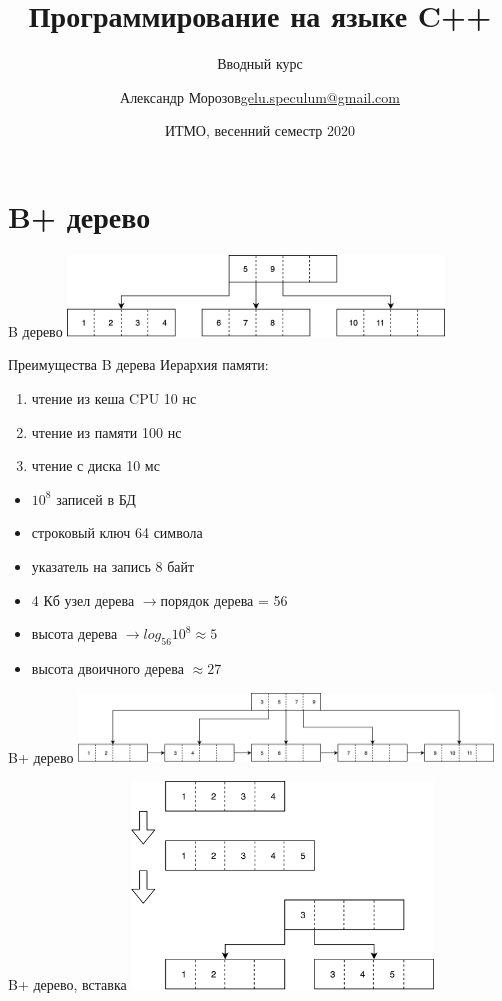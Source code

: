 \documentclass[unknownkeysallowed,xcolor=table]{beamer}
\title[C++]
{Программирование на языке C++}
\subtitle{Вводный курс}
\author[А.~Б.~Морозов]
{
  \texorpdfstring{Александр Морозов\newline\href{mailto:gelu.speculum@gmail.com}{gelu.speculum@gmail.com}}
  {Александр Морозов}
}
\date[ITMO 2020]
{ИТМО, весенний семестр 2020}
\newcommand{\textapprox}{\raisebox{0.5ex}{\texttildelow}}
\newcommand{\rarr}{$\rightarrow$}
\begin{document}
\frame{\titlepage}


\section{B+ дерево}

\begin{frame}{B дерево}
  \includegraphics[align=c,width=10cm,keepaspectratio]{images/btree.png}
\end{frame}

\begin{frame}{Преимущества B дерева}
  Иерархия памяти:
  \begin{enumerate}
    \item чтение из кеша CPU \textapprox 10 нс
    \item чтение из памяти \textapprox 100 нс
    \item чтение с диска \textapprox 10 мс
  \end{enumerate}
  \vspace{2em}
  \begin{itemize}
    \item $10^8$ записей в БД
    \item строковый ключ 64 символа
    \item указатель на запись 8 байт
    \item 4 Кб узел дерева \rarr порядок дерева = 56
    \item высота дерева \rarr $log_{56} 10^8 \approx 5$
    \item высота двоичного дерева $\approx 27$
  \end{itemize}
\end{frame}

\begin{frame}{B+ дерево}
  \includegraphics[align=c,width=11cm,keepaspectratio]{images/bptree.png}
\end{frame}

\begin{frame}{B+ дерево, вставка}
  \includegraphics[align=c,width=8cm,keepaspectratio]{images/bptree_insert.png}
\end{frame}
\end{document}
